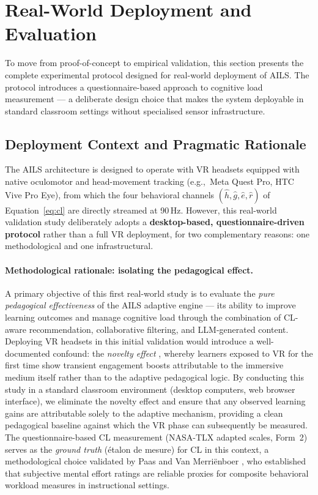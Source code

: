 \documentclass[ASNA,twocolumn]{USG} %
\begin{document}
\section{Real-World Deployment and Evaluation}
\label{sec:realworld}

To move from proof-of-concept to empirical validation, this section
presents the complete experimental protocol designed for real-world
deployment of AILS. The protocol introduces a questionnaire-based
approach to cognitive load measurement --- a deliberate design choice
that makes the system deployable in standard classroom settings
without specialised sensor infrastructure.

\subsection{Deployment Context and Pragmatic Rationale}
\label{sec:deployment_rationale}

The AILS architecture is designed to operate with VR headsets
equipped with native oculomotor and head-movement tracking
(e.g.,\ Meta Quest Pro, HTC Vive Pro Eye), from which the four
behavioral channels $(\hat{h}, \hat{g}, \hat{e}, \hat{r})$ of
Equation~\eqref{eq:cl} are directly streamed at 90\,Hz.
However, this real-world validation study deliberately adopts a
\textbf{desktop-based, questionnaire-driven protocol} rather than a
full VR deployment, for two complementary reasons: one methodological
and one infrastructural.

\paragraph{Methodological rationale: isolating the pedagogical effect.}
A primary objective of this first real-world study is to evaluate
the \emph{pure pedagogical effectiveness} of the AILS adaptive
engine --- its ability to improve learning outcomes and manage
cognitive load through the combination of CL-aware recommendation,
collaborative filtering, and LLM-generated content.
Deploying VR headsets in this initial validation would introduce a
well-documented confound: the \emph{novelty effect} \cite{Makransky2021},
whereby learners exposed to VR for the first time show transient
engagement boosts attributable to the immersive medium itself rather
than to the adaptive pedagogical logic.
By conducting this study in a standard classroom environment
(desktop computers, web browser interface), we eliminate the novelty
effect and ensure that any observed learning gains are attributable
solely to the adaptive mechanism, providing a clean pedagogical
baseline against which the VR phase can subsequently be measured.
The questionnaire-based CL measurement (NASA-TLX adapted scales,
Form~2) serves as the \emph{ground truth} (étalon de mesure) for CL
in this context, a methodological choice validated by Paas and Van
Merri\"{e}nboer \cite{Paas1994}, who established that subjective
mental effort ratings are reliable proxies for composite behavioral
workload measures in instructional settings.
\end{document}

